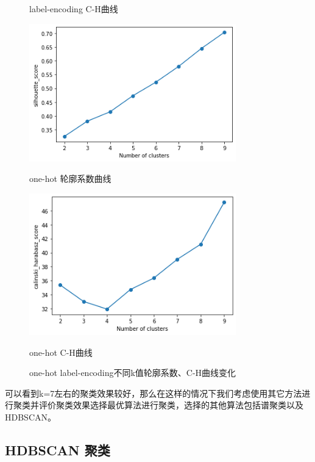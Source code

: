 \begin{figure}[htb]
\begin{minipage}[htb]{0.5\linewidth}
        \caption{label-encoding C-H曲线}
    \end{minipage}
    \begin{minipage}[htb]{0.5\linewidth}
        \centering
        \includegraphics[width=0.8\textwidth]{images/Kmeans-auto-sc-one-hot.png}
        \caption{one-hot 轮廓系数曲线}
    \end{minipage}
    \begin{minipage}[htb]{0.5\linewidth}
        \centering
        \includegraphics[width=0.8\textwidth]{images/Kmeans-auto-c-h-one-hot.png}
        \caption{one-hot C-H曲线}
    \end{minipage}
    \caption{one-hot label-encoding不同k值轮廓系数、C-H曲线变化}\label{k-differentencoding-SC-and-CH-curve-change} %
\end{figure}

\newpage
可以看到k=7左右的聚类效果较好，那么在这样的情况下我们考虑使用其它方法进行聚类并评价聚类效果选择最优算法进行聚类，选择的其他算法包括谱聚类以及HDBSCAN。

\subsection{HDBSCAN 聚类}

